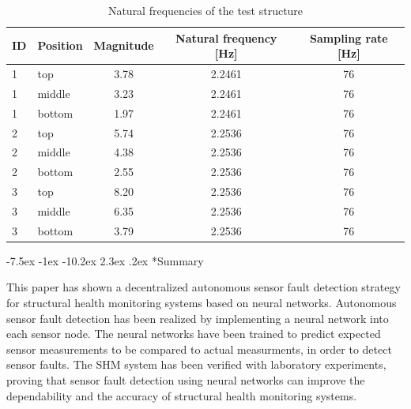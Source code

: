 \documentclass[12pt,a4paper]{scrartcl}
\makeatletter
\renewcommand\section{\@startsection{section}{1}{\z@}%
                     {-7.5ex \@plus -1ex \@minus -10.2ex}%
                     {2.3ex \@plus.2ex}%
                     {\sffamily\large\bfseries}}
\makeatother
\begin{document}
%


\begin{table}[hb]
	\centering
	\begin{tabular}{l l c c c}
		\toprule
		ID & Position & Magnitude & Natural frequency [Hz] & Sampling rate [Hz]\\ 
		\midrule
		1 & top & 3.78 & 2.2461 & 76\\ 
		1 & middle & 3.23 & 2.2461 & 76\\ 
		1 & bottom & 1.97 & 2.2461 & 76\\ 
		\midrule	
		2 & top & 5.74 & 2.2536 & 76\\  
		2 & middle & 4.38 & 2.2536 & 76\\ 
		2 & bottom & 2.55 & 2.2536 & 76\\
		\midrule
		3 & top & 8.20 & 2.2536 & 76\\
		3 & middle & 6.35 & 2.2536 & 76\\ 
		3 & bottom & 3.79 & 2.2536 & 76\\
		\bottomrule
	\end{tabular}
	\caption{Natural frequencies of the test structure}
	\label{tab:lab-ex}
\end{table}


\section*{Summary}

This paper has shown a decentralized autonomous sensor fault detection strategy for structural health monitoring systems based on neural networks. 
Autonomous sensor fault detection has been realized by implementing a neural network into each sensor node.
The neural networks have been trained to predict expected sensor measurements to be compared to actual measurments, in order to detect sensor faults.
The SHM system has been verified with laboratory experiments, proving that sensor fault detection using neural networks can improve the dependability and the accuracy of structural health monitoring systems.




\end{document}
